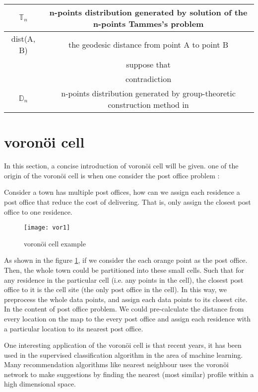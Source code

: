 \documentclass[12pt]{article}
\numberwithin{equation}{section}
\let\bb\mathbb
\let\bb\mathbb
\newcommand{\suppose}{\begin{tikzpicture}[scale=0.35,thick]
		
		\draw (1.55mm,-0.7mm)arc (40:270:2mm);
		\draw (-0mm,-8mm)arc (270:450:2mm);
		\draw (0,-4mm)--(0,-11.5mm);
\end{tikzpicture} }
\begin{document}
		
		\begin{tabular}{|c|c|}
			\hline 
			$\bb{T}_n$ & n-points distribution generated by solution of the n-points Tammes's problem \\
			\hline 
			dist(A, B) & the geodesic distance from point A to point B \\
			\hline
			\suppose & suppose that \\
			\hline 
			\Lightning & contradiction \\
			\hline
			$\bb{D}_n$ & n-points distribution generated by group-theoretic construction method in \cite{lubotzky_1986_hecke} \\
			\hline
		\end{tabular}
		
	\newpage
	\section{voronöi cell}
		In this section, a concise introduction of voronöi cell will be given. one of the origin of the voronöi cell is when one consider the post office problem : \par 
		Consider a town has multiple post offices, how can we assign each residence a post office that reduce the cost of delivering. That is, only assign the closest post office to one residence.
		
		\begin{figure}
				\centering
				\texttt{[image: vor1]}
				\caption{voronöi cell example}
				\label{fig:vor1}
		\end{figure}

		As shown in the figure \ref{fig:vor1}, if we consider the each orange point as the post office. Then, the whole town could be partitioned into these small cells. Such that for any residence in the particular cell (i.e. any points in the cell), the closest post office to it is the cell site (the only post office in the cell). In this way, we preprocess the whole data points, and assign each data points to its closest cite. In the content of post office problem. We could pre-calculate the distance from every location on the map to the every post office and assign each residence with a particular location to its nearest post office. \par 
		One interesting application of the voronöi cell is that recent years, it has been used in the supervised classification algorithm in the area of machine learning. Many recommendation algorithms like nearest neighbour uses the voronöi network to make suggestions by finding the nearest (most similar) profile within a high dimensional space. \par 
\end{document}
